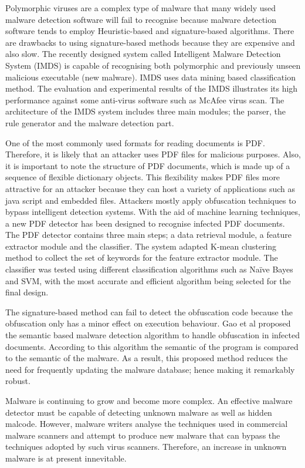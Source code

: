Polymorphic viruses are a complex type of malware that many widely used malware
detection software will fail to recognise because malware detection software
tends to employ Heuristic-based and signature-based algorithms. There are
drawbacks to using signature-based methods because they are expensive and also
slow.  The recently designed system called Intelligent Malware Detection System
(IMDS) is capable of recognising both polymorphic and previously unseen
malicious executable (new malware). IMDS uses data mining based classification
method. The evaluation and experimental results of the IMDS illustrates its
high performance against some anti-virus software such as McAfee virus scan.
The architecture of the IMDS system includes three main modules; the parser,
the rule generator and the malware detection part\cite{IMDS}.

One of the most commonly used formats for reading documents is PDF. Therefore,
it is likely that an attacker uses PDF files for malicious purposes. Also, it
is important to note the structure of PDF documents, which is made up of a
sequence of flexible dictionary objects. This flexibility makes PDF files more
attractive for an attacker because they can host a variety of applications such
as java script and embedded files. Attackers mostly apply obfuscation
techniques to bypass intelligent detection systems. With the aid of machine
learning techniques, a new PDF detector has been designed to recognise infected
PDF documents\cite{maiorca2012pattern}.  The PDF detector contains three main
steps; a data retrieval module, a feature extractor module and the classifier.
The system adapted K-mean clustering method to collect the set of keywords for
the feature extractor module. The classifier was tested using different
classification algorithms such as Naïve Bayes and SVM, with the most accurate
and efficient algorithm being selected for the final
design\cite{maiorca2012pattern}.
 
The signature-based method can fail to detect the obfuscation code because the
obfuscation only has a minor effect on execution behaviour. Gao et al proposed
the semantic based malware detection algorithm to handle obfuscation in
infected documents. According to this algorithm the semantic of the program is
compared to the semantic of the malware. As a result, this proposed method
reduces the need for frequently updating the malware database; hence making it
remarkably robust\cite{Amom}. 


Malware is continuing to grow and become more complex. An effective malware
detector must be capable of detecting unknown malware as well as hidden
malcode. However, malware writers analyse the techniques used in commercial
malware scanners and attempt to produce new malware that can bypass the
techniques adopted by such virus scanners. Therefore, an increase in unknown
malware is at present innevitable\cite{vinod2009survey}.


